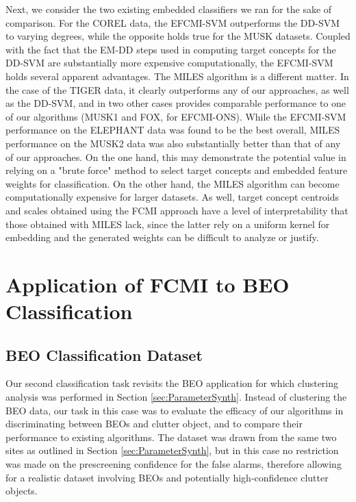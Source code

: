 \documentclass[12pt,dvips]{report}
\numberwithin{equation}{section}
\begin{document}
Next, we consider the two existing embedded classifiers we ran for the sake of comparison.  For the COREL data, the EFCMI-SVM outperforms the DD-SVM to varying degrees, while the opposite holds true for the MUSK datasets.  Coupled with the fact that the EM-DD steps used in computing target concepts for the DD-SVM are substantially more expensive computationally, the EFCMI-SVM holds several apparent advantages.  The MILES algorithm is a different matter.  In the case of the TIGER data, it clearly outperforms any of our approaches, as well as the DD-SVM, and in two other cases provides comparable performance to one of our algorithms (MUSK1 and FOX, for EFCMI-ONS).  While the EFCMI-SVM performance on the ELEPHANT data was found to be the best overall, MILES performance on the MUSK2 data was also substantially better than that of any of our approaches.   On the one hand, this may demonstrate the potential value in relying on a "brute force" method to select target concepts and embedded feature weights for classification.  On the other hand, the MILES algorithm can become computationally expensive for larger datasets.  As well, target concept centroids and scales obtained using the FCMI approach have a level of interpretability that those obtained with MILES lack, since the latter rely on a uniform kernel for embedding and the generated weights can be difficult to analyze or justify.

\section{Application of FCMI to BEO Classification}

\subsection{BEO Classification Dataset} \label{subsec:BEOClassDataset}
Our second classification task revisits the BEO application for which clustering analysis was performed in Section \ref{sec:ParameterSynth}.  Instead of clustering the BEO data, our task in this case was to evaluate the efficacy of our algorithms in discriminating between BEOs and clutter object, and to compare their performance to existing algorithms.  The dataset was drawn from the same two sites as outlined in Section \ref{sec:ParameterSynth}, but in this case no restriction was made on the prescreening confidence for the false alarms, therefore allowing for a realistic dataset involving BEOs and potentially high-confidence clutter objects.  
\end{document}
